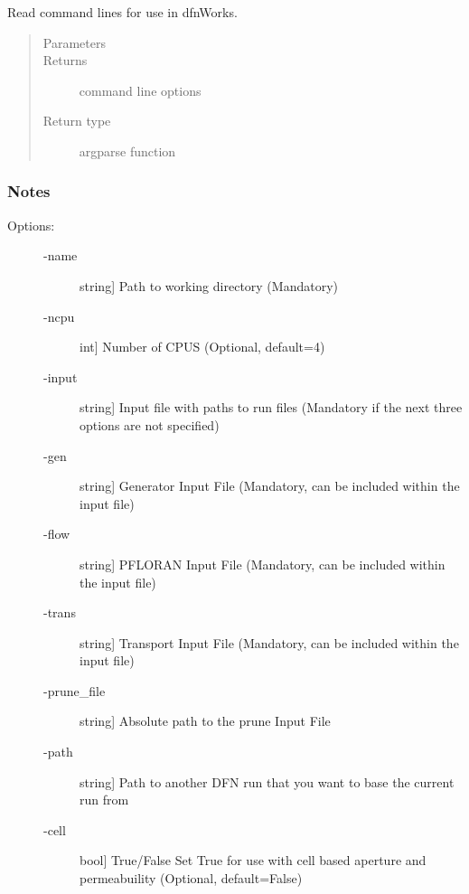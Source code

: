 \documentclass[letterpaper,10pt,english]{sphinxmanual}
\begin{document}
\begin{fulllineitems}
\label{\detokenize{pydfnworks:pydfnworks.general.dfnworks.commandline_options}}
Read command lines for use in dfnWorks.
\begin{quote}\begin{description}
\item[{Parameters}] \leavevmode
{} \textendash{} 

\item[{Returns}] \leavevmode
{} \textendash{} command line options

\item[{Return type}] \leavevmode
argparse function

\end{description}\end{quote}
\subsubsection*{Notes}
\begin{description}
\item[{Options:}] \leavevmode\begin{description}
\item[{-name}] \leavevmode{[}string{]}
Path to working directory (Mandatory)

\item[{-ncpu}] \leavevmode{[}int{]}
Number of CPUS (Optional, default=4)

\item[{-input}] \leavevmode{[}string{]}
Input file with paths to run files (Mandatory if the next three options are not specified)

\item[{-gen}] \leavevmode{[}string{]}
Generator Input File (Mandatory, can be included within the input file)

\item[{-flow}] \leavevmode{[}string{]}
PFLORAN Input File (Mandatory, can be included within the input file)

\item[{-trans}] \leavevmode{[}string{]}
Transport Input File (Mandatory, can be included within the input file)

\item[{-prune\_file}] \leavevmode{[}string{]}
Absolute path to the prune Input File

\item[{-path}] \leavevmode{[}string{]}
Path to another DFN run that you want to base the current run from

\item[{-cell}] \leavevmode{[}bool{]}
True/False Set True for use with cell based aperture and permeabuility (Optional, default=False)

\end{description}

\end{description}

\end{fulllineitems}
\end{document}
